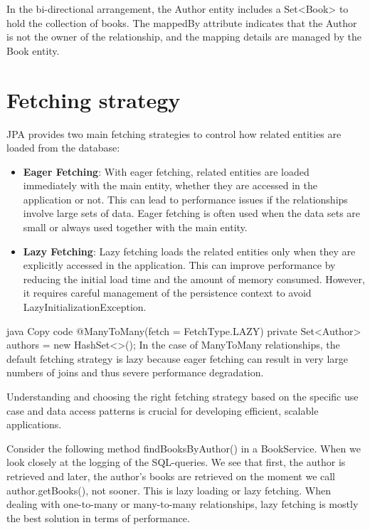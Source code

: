 In the bi-directional arrangement, the Author entity includes a Set<Book> to hold the collection of books. The mappedBy attribute indicates that the Author is not the owner of the relationship, and the mapping details are managed by the Book entity.

\section{Fetching strategy}

JPA provides two main fetching strategies to control how related entities are loaded from the database:

\begin{itemize}
\item \textbf{Eager Fetching}: With eager fetching, related entities are loaded immediately with the main entity, whether they are accessed in the application or not. This can lead to performance issues if the relationships involve large sets of data. Eager fetching is often used when the data sets are small or always used together with the main entity.

\item \textbf{Lazy Fetching}: Lazy fetching loads the related entities only when they are explicitly accessed in the application. This can improve performance by reducing the initial load time and the amount of memory consumed. However, it requires careful management of the persistence context to avoid LazyInitializationException.
\end{itemize}

java
Copy code
@ManyToMany(fetch = FetchType.LAZY)
private Set<Author> authors = new HashSet<>();
In the case of ManyToMany relationships, the default fetching strategy is lazy because eager fetching can result in very large numbers of joins and thus severe performance degradation.

Understanding and choosing the right fetching strategy based on the specific use case and data access patterns is crucial for developing efficient, scalable applications.

Consider the following method findBooksByAuthor() in a BookService.
When we look closely at the logging of the SQL-queries. We see that first, the author is retrieved and later, the author's books are retrieved on the moment we call author.getBooks(), not sooner. This is lazy loading or lazy fetching. When dealing with one-to-many or many-to-many relationships, lazy fetching is mostly the best solution in terms of performance.


